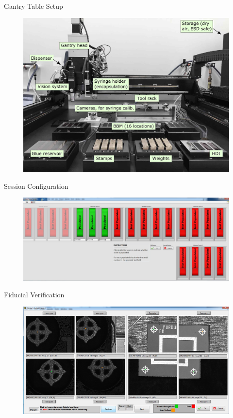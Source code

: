 \documentclass{beamer}
\begin{document}
\begin{frame}{Gantry Table Setup}
\begin{figure}
    \centering
    \includegraphics[width=\textwidth]{"figures/Gantry Table"}
    \label{fig:gantry_table}
\end{figure}
\end{frame}

\begin{frame}{Session Configuration}
\begin{figure}
    \centering
    \includegraphics[width=\textwidth]{"figures/ui/configure_tester"}
    \label{fig:configure_tester}
\end{figure}
\end{frame}

\begin{frame}{Fiducial Verification}
\begin{figure}
    \centering
    \includegraphics[width=\textwidth]{"figures/ui/review_fiducials"}
    \label{fig:review_fiducials}
\end{figure}
\end{frame}
\end{document}
